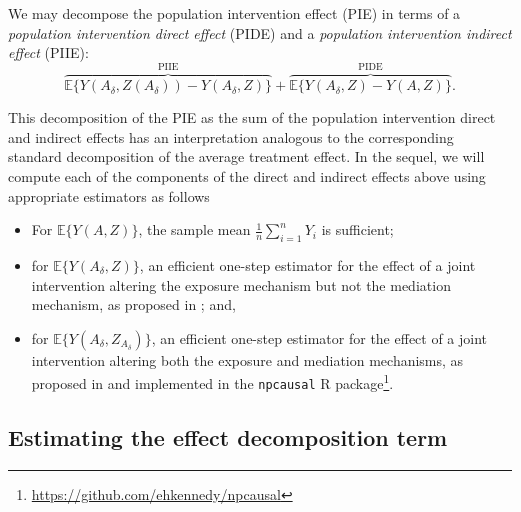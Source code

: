 \documentclass[
  12pt,
]{book}
\newcommand{\passthrough}[1]{#1}
\providecommand{\tightlist}{%
  \setlength{\itemsep}{0pt}\setlength{\parskip}{0pt}}
\renewcommand{\href}[2]{#2\footnote{\url{#1}}}
\theoremstyle{definition}
\theoremstyle{definition}
\theoremstyle{definition}
\newcommand{\1}{\mathbbm{1}}
\begin{document}
We may decompose the population intervention effect (PIE) in terms of a
\emph{population intervention direct effect} (PIDE) and a \emph{population
intervention indirect effect} (PIIE):
\begin{equation*}
  \overbrace{\mathbb{E}\{Y(A_\delta, Z(A_\delta)) -
    Y(A_\delta, Z)\}}^{\text{PIIE}} +
    \overbrace{\mathbb{E}\{Y(A_\delta, Z) - Y(A, Z)\}}^{\text{PIDE}}.
\end{equation*}

This decomposition of the PIE as the sum of the population intervention direct
and indirect effects has an interpretation analogous to the corresponding
standard decomposition of the average treatment effect. In the sequel, we will
compute each of the components of the direct and indirect effects above using
appropriate estimators as follows

\begin{itemize}
\tightlist
\item
  For \(\mathbb{E}\{Y(A, Z)\}\), the sample mean \(\frac{1}{n}\sum_{i=1}^n Y_i\) is
  sufficient;
\item
  for \(\mathbb{E}\{Y(A_{\delta}, Z)\}\), an efficient one-step estimator for the
  effect of a joint intervention altering the exposure mechanism but not the
  mediation mechanism, as proposed in \citet{diaz2020causal}; and,
\item
  for \(\mathbb{E}\{Y(A_{\delta}, Z_{A_{\delta}})\}\), an efficient one-step
  estimator for the effect of a joint intervention altering both the exposure
  and mediation mechanisms, as proposed in \citet{kennedy2017nonparametric} and
  implemented in the \href{https://github.com/ehkennedy/npcausal}{\passthrough{\lstinline!npcausal!} R
  package}.
\end{itemize}

\hypertarget{estimating-the-effect-decomposition-term}{%
\subsection{Estimating the effect decomposition term}\label{estimating-the-effect-decomposition-term}}
\end{document}
